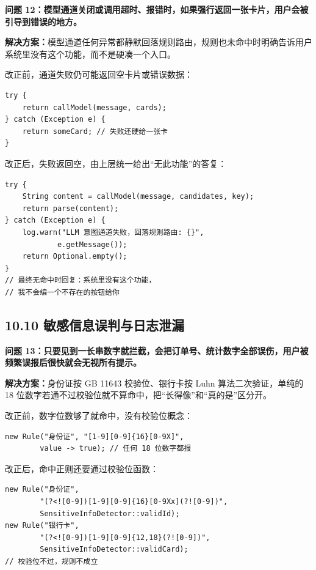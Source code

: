 \documentclass[zihao=-4,UTF8,openany]{ctexart}
\renewcommand{\_}{\textunderscore\allowbreak}
\begin{document}
\noindent\textbf{问题 12：模型通道关闭或调用超时、报错时，如果强行返回一张卡片，用户会被引导到错误的地方。}

\textbf{解决方案：}模型通道任何异常都静默回落规则路由，规则也未命中时明确告诉用户系统里没有这个功能，而不是硬凑一个入口。

改正前，通道失败仍可能返回空卡片或错误数据：

\begin{lstlisting}
try {
    return callModel(message, cards);
} catch (Exception e) {
    return someCard; // 失败还硬给一张卡
}
\end{lstlisting}

改正后，失败返回空，由上层统一给出“无此功能”的答复：

\begin{lstlisting}
try {
    String content = callModel(message, candidates, key);
    return parse(content);
} catch (Exception e) {
    log.warn("LLM 意图通道失败，回落规则路由: {}",
            e.getMessage());
    return Optional.empty();
}
// 最终无命中时回复：系统里没有这个功能，
// 我不会编一个不存在的按钮给你
\end{lstlisting}

\subsection*{\texorpdfstring{\textbf{10.10 敏感信息误判与日志泄漏}}{10.10 敏感信息误判与日志泄漏}}\label{ux654fux611fux4fe1ux606f}

\noindent\textbf{问题 13：只要见到一长串数字就拦截，会把订单号、统计数字全部误伤，用户被频繁误报后很快就会无视所有提示。}

\textbf{解决方案：}身份证按 GB 11643 校验位、银行卡按 Luhn 算法二次验证，单纯的 18 位数字若通不过校验位就不算命中，把“长得像”和“真的是”区分开。

改正前，数字位数够了就命中，没有校验位概念：

\begin{lstlisting}
new Rule("身份证", "[1-9][0-9]{16}[0-9X]",
        value -> true); // 任何 18 位数字都报
\end{lstlisting}

改正后，命中正则还要通过校验位函数：

\begin{lstlisting}
new Rule("身份证",
        "(?<![0-9])[1-9][0-9]{16}[0-9Xx](?![0-9])",
        SensitiveInfoDetector::validId);
new Rule("银行卡",
        "(?<![0-9])[1-9][0-9]{12,18}(?![0-9])",
        SensitiveInfoDetector::validCard);
// 校验位不过，规则不成立
\end{lstlisting}
\end{document}
